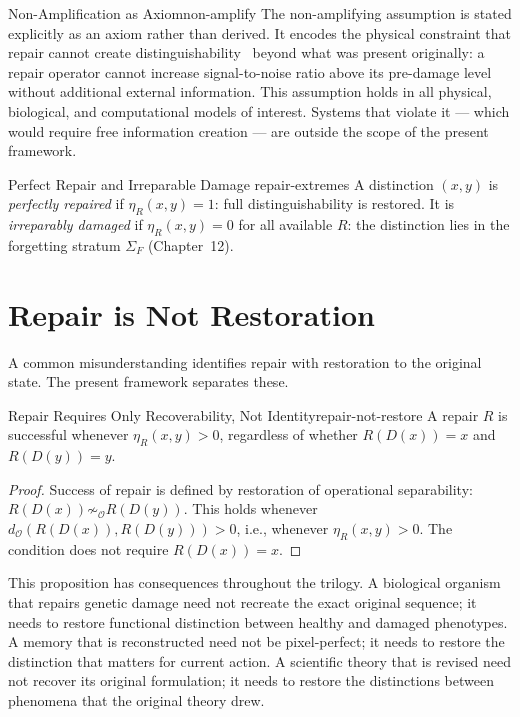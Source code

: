 \documentclass[12pt,twoside,openright]{book}
\newcommand{\obs}{\mathcal{O}}
\newcommand{\distMetric}{d_{\mathcal{O}}}
\newcommand{\strataF}{\Sigma_{F}}   %
\providecommand{\repairEff}[1]{\eta_{R}(#1)}
\providecommand{\degradeOp}{D}
\providecommand{\strataF}{\Sigma_{F}}
\begin{document}
\begin{remark}{Non-Amplification as Axiom}{non-amplify}
The non-amplifying assumption is stated explicitly as an axiom
rather than derived. It encodes the physical constraint that
repair cannot create distinguishability~\cite{friston2010} beyond what was present
originally: a repair operator cannot increase signal-to-noise
ratio above its pre-damage level without additional external
information. This assumption holds in all physical, biological,
and computational models of interest. Systems that violate it
--- which would require free information creation --- are
outside the scope of the present framework.
\end{remark}

\begin{definition}{Perfect Repair and Irreparable Damage}%
  {repair-extremes}
A distinction $(x,y)$ is \emph{perfectly repaired} if
$\repairEff{x,y}=1$: full distinguishability is restored.
It is \emph{irreparably damaged} if $\repairEff{x,y}=0$ for
all available $R$: the distinction lies in the forgetting
stratum $\strataF$ (Chapter~12).
\end{definition}

\section{Repair is Not Restoration}

A common misunderstanding identifies repair with restoration
to the original state. The present framework separates these.

\begin{proposition}{Repair Requires Only Recoverability, Not
  Identity}{repair-not-restore}
A repair $R$ is successful whenever
$\repairEff{x,y}>0$, regardless of whether
$R(\degradeOp(x))=x$ and $R(\degradeOp(y))=y$.
\begin{proof}
Success of repair is defined by restoration of operational
separability: $R(\degradeOp(x))\not\sim_\obs R(\degradeOp(y))$.
This holds whenever $\distMetric(R(\degradeOp(x)),R(\degradeOp(y)))>0$,
i.e., whenever $\repairEff{x,y}>0$. The condition does not
require $R(\degradeOp(x))=x$.
\end{proof}
\end{proposition}

This proposition has consequences throughout the trilogy. A
biological organism that repairs genetic damage need not
recreate the exact original sequence; it needs to restore
functional distinction between healthy and damaged phenotypes.
A memory that is reconstructed need not be pixel-perfect; it
needs to restore the distinction that matters for current
action. A scientific theory that is revised need not recover
its original formulation; it needs to restore the distinctions
between phenomena that the original theory drew.
\end{document}
